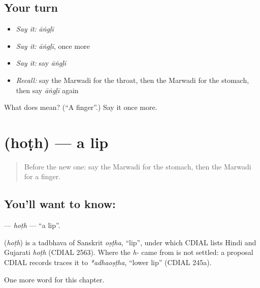 \subsection*{Your turn}
\begin{itemize}
\raggedright
  \item \emph{Say it:} \emph{āṅgḷī}
  \item \emph{Say it:} \emph{āṅgḷī}, once more
  \item \emph{Say it:} say \emph{āṅgḷī}
  \item \emph{Recall:} say the Marwadi for the throat, then the Marwadi for the stomach, then say \emph{āṅgḷī} again
\end{itemize}

\begin{tcolorbox}[breakable,colback=teal!4,colframe=teal!35!black,title={Before you move on}]
What does  mean? (\textquotedblleft{}A finger\textquotedblright{}.) Say it once more.
\end{tcolorbox}
\section[\texorpdfstring{\mw{होठ} (hoṭh)}{होठ (hoṭh)}]{ (hoṭh) — a lip}

\label{lesson:MW-C45-hoth}



\begin{quote}
Before the new one: say the Marwadi for the stomach, then the Marwadi for a finger.
\end{quote}

\subsection*{You'll want to know: }
\textbf{} — \emph{hoṭh} — \textquotedblleft{}a lip\textquotedblright{}.

\begin{cousinweb}
\textbf{} (\emph{hoṭh}) is a tadbhava of Sanskrit \emph{oṣṭha}, \textquotedblleft{}lip\textquotedblright{}, under which CDIAL lists Hindi and Gujarati \emph{hoṭh} (CDIAL 2563). Where the \emph{h-} came from is not settled: a proposal CDIAL records traces it to \emph{*adhaoṣṭha}, \textquotedblleft{}lower lip\textquotedblright{} (CDIAL 245a).
\end{cousinweb}

\begin{grammarlens}[title={What you've built}]
One more word for this chapter.
\end{grammarlens}

